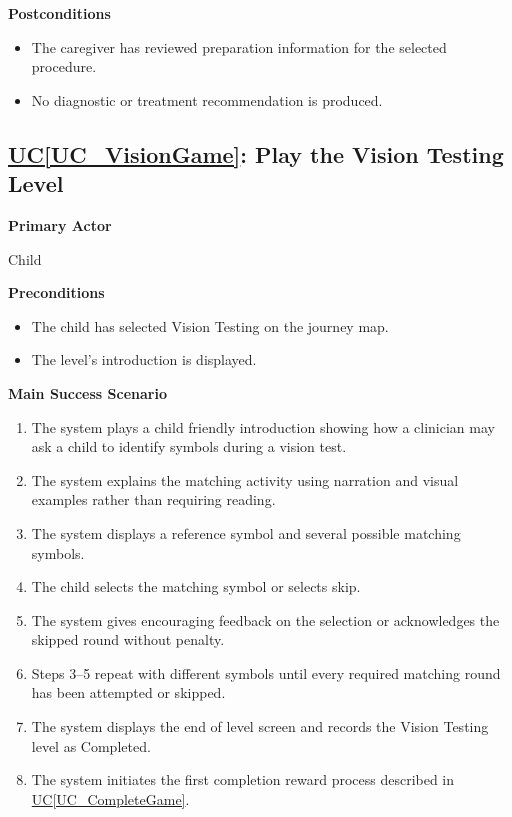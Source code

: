 \documentclass[12pt]{article}
\newcounter{ucnum} %
\newcommand{\ucref}[1]{\hyperref[#1]{UC\ref*{#1}}}
\begin{document}
\textbf{Postconditions}
\begin{itemize}
    \item The caregiver has reviewed preparation information for
    the selected procedure.
    \item No diagnostic or treatment recommendation is produced.
\end{itemize}

\label{UC_VisionGame}
\subsection{\ucref{UC_VisionGame}: Play the Vision Testing Level}

\textbf{Primary Actor}

Child

\textbf{Preconditions}
\begin{itemize}
    \item The child has selected Vision Testing on the journey map.
    \item The level's introduction is displayed.
\end{itemize}

\textbf{Main Success Scenario}
\begin{enumerate}
    \item The system plays a child friendly introduction showing
    how a clinician may ask a child to identify symbols during
    a vision test.
    \item The system explains the matching activity using narration
    and visual examples rather than requiring reading.
    \item The system displays a reference symbol and several
    possible matching symbols.
    \item The child selects the matching symbol or selects skip.
    \item The system gives encouraging feedback on the selection
    or acknowledges the skipped round without penalty.
    \item Steps 3--5 repeat with different symbols until every
    required matching round has been attempted or skipped.
    \item The system displays the end of level screen and records
    the Vision Testing level as Completed.
    \item The system initiates the first completion reward process
    described in \ucref{UC_CompleteGame}.
\end{enumerate}
\end{document}
